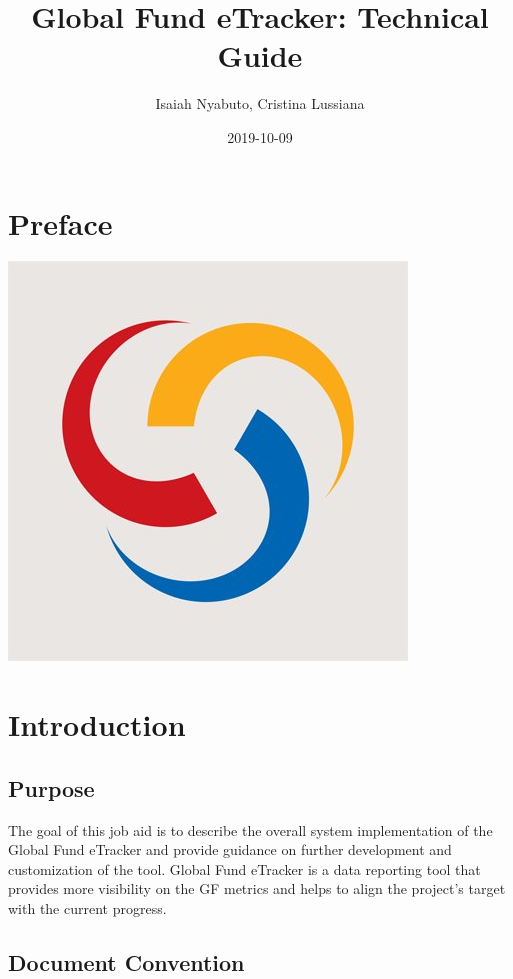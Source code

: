 \documentclass[]{book}
\title{Global Fund eTracker: Technical Guide}
\author{Isaiah Nyabuto, Cristina Lussiana}
\date{2019-10-09}
\begin{document}
\maketitle

{
\setcounter{tocdepth}{1}
\tableofcontents
}
\hypertarget{preface}{%
\chapter*{Preface}\label{preface}}

\includegraphics{./images/gf_logo copy.jpg}

\hypertarget{introduction}{%
\chapter{Introduction}\label{introduction}}

\hypertarget{purpose}{%
\section{Purpose}\label{purpose}}

The goal of this job aid is to describe the overall system implementation of the Global Fund eTracker and provide guidance on further development and customization of the tool. Global Fund eTracker is a data reporting tool that provides more visibility on the GF metrics and helps to align the project's target with the current progress.

\hypertarget{document-convention}{%
\section{Document Convention}\label{document-convention}}
\end{document}
